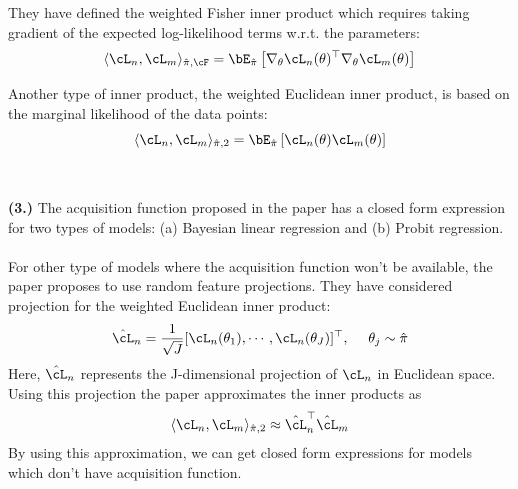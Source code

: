 \documentclass[a4paper,11pt]{article}
\begin{document}
\begin{pmisolution}
They have defined the weighted Fisher inner product which requires taking gradient of the expected log-likelihood terms w.r.t. the parameters:
\begin{equation*}
    \langle\cL_n, \cL_m \rangle_{\hat{\pi}, \cF} = \bE_{\hat{\pi}}\left[ \nabla_\theta \cL_n(\theta)^\top \nabla_\theta\cL_m(\theta) \right]
\end{equation*}

Another type of inner product, the weighted Euclidean inner product, is based on the marginal likelihood of the data points:
\begin{equation*}
    \langle\cL_n, \cL_m \rangle_{\hat{\pi}, 2} = \bE_{\hat{\pi}}\left[ \cL_n(\theta) \cL_m(\theta) \right]
\end{equation*}
\\ \\
\noindent \textbf{(3.) } The acquisition function proposed in the paper has a closed
form expression for two types of models: (a) Bayesian linear regression and (b) Probit regression.
\\ \\
\noindent For other type of models where the acquisition function won’t be available, the paper proposes to use random feature projections. They have considered projection for the weighted Euclidean inner product:
\begin{equation*}
    \hat{\cL}_n = \frac{1}{\sqrt{J}}[\cL_n(\theta_1), \cdots , \cL_n(\theta_J)]^\top, ~~~~ \theta_j \sim \hat{\pi}
\end{equation*}
Here, $\hat{\cL}_n$ represents the J-dimensional projection of $\cL_n$ in Euclidean space. Using this projection the paper approximates the inner products as
\begin{equation*}
    \langle \cL_n, \cL_m \rangle_{\hat{\pi}, 2} \approx \hat{\cL}_n^\top \hat{\cL}_m
\end{equation*}
By using this approximation, we can get closed form expressions for models which don't have acquisition function.
\end{pmisolution}
\end{document}
